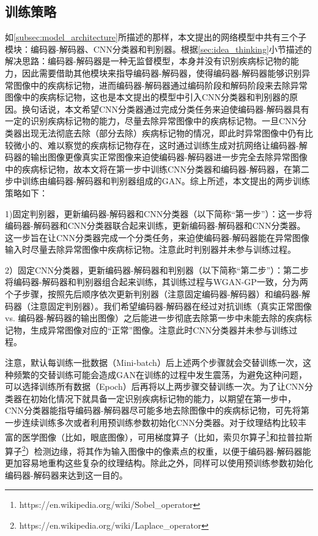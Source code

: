 \subsection{训练策略}\label{subsec:traing_stragies}
如\ref{subsec:model_architecture}所描述的那样，本文提出的网络模型中共有三个子模块：编码器-解码器、CNN分类器和判别器。根据\ref{sec:idea_thinking}小节描述的解决思路：编码器-解码器是一种无监督模型，本身并没有识别疾病标记物的能力，因此需要借助其他模块来指导编码器-解码器，使得编码器-解码器能够识别异常图像中的疾病标记物，进而编码器-解码器通过编码阶段和解码阶段来去除异常图像中的疾病标记物，这也是本文提出的模型中引入CNN分类器和判别器的原因。换句话说，本文希望CNN分类器通过完成分类任务来迫使编码器-解码器具有一定的识别疾病标记物的能力，尽量去除异常图像中的疾病标记物。一旦CNN分类器出现无法彻底去除（部分去除）疾病标记物的情况，即此时异常图像中仍有比较微小的、难以察觉的疾病标记物存在，这时通过训练生成对抗网络让编码器-解码器的输出图像更像真实正常图像来迫使编码器-解码器进一步完全去除异常图像中的疾病标记物，故本文将在第一步中训练CNN分类器和编码器-解码器，在第二步中训练由编码器-解码器和判别器组成的GAN。综上所述，本文提出的两步训练策略如下：

1)固定判别器，更新编码器-解码器和CNN分类器（以下简称“第一步”）：这一步将编码器-解码器和CNN分类器联合起来训练，更新编码器-解码器和CNN分类器。这一步旨在让CNN分类器完成一个分类任务，来迫使编码器-解码器能在异常图像输入时尽量去除异常图像中疾病标记物。注意此时判别器并未参与训练过程。

2）固定CNN分类器，更新编码器-解码器和判别器（以下简称“第二步”）：第二步将编码器-解码器和判别器组合起来训练，其训练过程与WGAN-GP一致，分为两个子步骤，按照先后顺序依次更新判别器（注意固定编码器-解码器）和编码器-解码器（注意固定判别器）。我们希望编码器-解码器在经过对抗训练（真实正常图像 vs. 编码器-解码器的输出图像）之后能进一步彻底去除第一步中未能去除的疾病标记物，生成异常图像对应的“正常”图像。注意此时CNN分类器并未参与训练过程。

注意，默认每训练一批数据（Mini-batch）后上述两个步骤就会交替训练一次，这种频繁的交替训练可能会造成GAN在训练的过程中发生震荡，为避免这种问题，可以选择训练所有数据（Epoch）后再将以上两步骤交替训练一次。为了让CNN分类器在初始化情况下就具备一定识别疾病标记物的能力，以期望在第一步中，CNN分类器能指导编码器-解码器尽可能多地去除图像中的疾病标记物，可先将第一步连续训练多次或者利用预训练参数初始化CNN分类器。对于纹理结构比较丰富的医学图像（比如，眼底图像），可用梯度算子（比如，索贝尔算子\footnote{https://en.wikipedia.org/wiki/Sobel\_operator}和拉普拉斯算子\footnote{https://en.wikipedia.org/wiki/Laplace\_operator}）检测边缘，将其作为输入图像中的像素点的权重，以便于编码器-解码器能更加容易地重构这些复杂的纹理结构。除此之外，同样可以使用预训练参数初始化编码器-解码器来达到这一目的。


